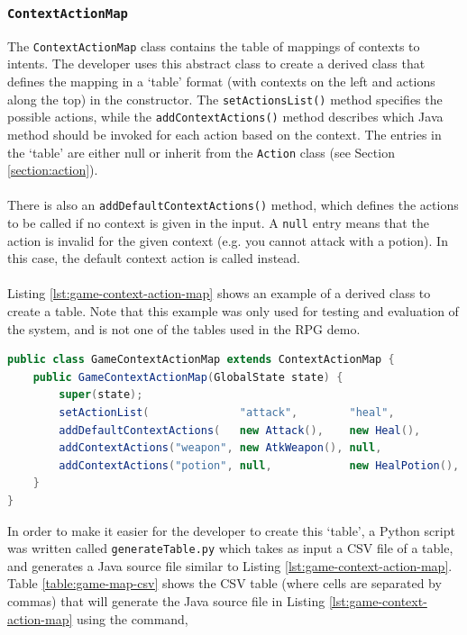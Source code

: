 \documentclass[11pt]{article}
\begin{document}
\subsubsection{\texttt{ContextActionMap}}
\label{section:context-action-map}

The \texttt{ContextActionMap} class contains the table of mappings of contexts to intents. The developer uses this abstract class to create a derived class that defines the mapping in a `table' format (with contexts on the left and actions along the top) in the constructor. The \texttt{setActionsList()} method specifies the possible actions, while the \texttt{addContextActions()} method describes which Java method should be invoked for each action based on the context. The entries in the `table' are either null or inherit from the \texttt{Action} class (see Section \ref{section:action}).
\\
\\
There is also an \texttt{addDefaultContextActions()} method, which defines the actions to be called if no context is given in the input. A \texttt{null} entry means that the action is invalid for the given context (e.g. you cannot attack with a potion). In this case, the default context action is called instead.
\\
\\
Listing \ref{lst:game-context-action-map} shows an example of a derived class to create a table. Note that this example was only used for testing and evaluation of the system, and is not one of the tables used in the RPG demo.

\begin{lstlisting}[language=Java, caption=Example of a ContextActionMap, label={lst:game-context-action-map}]
public class GameContextActionMap extends ContextActionMap {
    public GameContextActionMap(GlobalState state) {
        super(state);
        setActionList(              "attack",        "heal",           "move");
        addDefaultContextActions(   new Attack(),    new Heal(),       new Move());
        addContextActions("weapon", new AtkWeapon(), null,             null);
        addContextActions("potion", null,            new HealPotion(), null);
    }
}
\end{lstlisting}

In order to make it easier for the developer to create this `table', a Python script was written called \texttt{generateTable.py} which takes as input a CSV file of a table, and generates a Java source file similar to Listing \ref{lst:game-context-action-map}. Table \ref{table:game-map-csv} shows the CSV table (where cells are separated by commas) that will generate the Java source file in Listing \ref{lst:game-context-action-map} using the command, 
\end{document}
